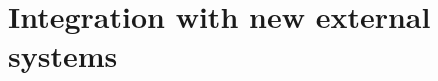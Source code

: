 \documentclass[Main]{subfiles}
\begin{document}
\section{Integration with new external systems}
\end{document}
